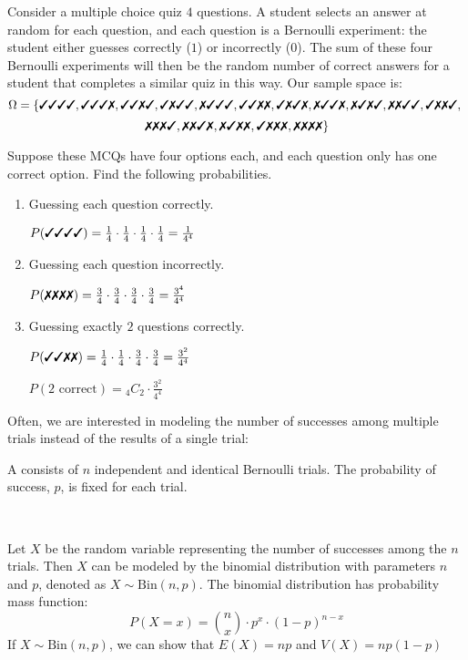 \begin{example}
    Consider a multiple choice quiz $4$ questions. A student selects an answer at random for each question, and each question is a Bernoulli experiment: the student either guesses correctly ($1$) or incorrectly ($0$). The sum of these four Bernoulli experiments will then be the random number of correct answers for a student that completes a similar quiz in this way. Our sample space is: 
    $$\Omega = \left\{ \cmark \cmark \cmark \cmark, \cmark \cmark \cmark \xmark, \cmark \cmark \xmark \cmark, \cmark \xmark \cmark \cmark, \xmark \cmark \cmark \cmark, \cmark \cmark \xmark \xmark, \cmark \xmark \cmark \xmark, \xmark \cmark \cmark \xmark, \xmark \cmark \xmark \cmark, \xmark \xmark \cmark \cmark, \cmark \xmark \xmark \cmark, \right.$$
    $$\left. \xmark \xmark \xmark \cmark, \xmark \xmark \cmark \xmark, \xmark \cmark \xmark \xmark, \cmark \xmark \xmark \xmark, \xmark \xmark \xmark \xmark \right\}$$

    Suppose these MCQs have four options each, and each question only has one correct option. Find the following probabilities. 

    \begin{enumerate}[label=\alph*)]
        \item Guessing each question correctly. 

        $P(\cmark \cmark \cmark \cmark) = \frac{1}{4} \cdot \frac{1}{4} \cdot \frac{1}{4} \cdot \frac{1}{4} = \frac{1}{4^4}$

        \item Guessing each question incorrectly. 

        $P(\xmark \xmark \xmark \xmark) = \frac{3}{4} \cdot \frac{3}{4} \cdot \frac{3}{4} \cdot \frac{3}{4} = \frac{3^4}{4^4}$
        \item Guessing exactly $2$ questions correctly. 

        $P(\cmark \cmark \xmark \xmark) = \frac{1}{4} \cdot \frac{1}{4} \cdot \frac{3}{4} \cdot \frac{3}{4} = \frac{3^2}{4^4}$

        $P(2 \text{ correct}) = {}_4C_2 \cdot \frac{3^2}{4^4}$
    \end{enumerate}
\end{example}

Often, we are interested in modeling the number of successes among multiple trials instead of the results of a single trial:

\begin{definition}
    A  consists of $n$ independent and identical Bernoulli trials. The probability of success, $p$, is fixed for each trial. 

    {~~~}

    Let $X$ be the random variable representing the number of successes among the $n$ trials. Then $X$ can be modeled by the binomial distribution with parameters $n$ and $p$, denoted as $X \sim \mathrm{Bin}(n, p)$. The binomial distribution has probability mass function: $$P(X = x) = \binom{n}{x} \cdot p^x \cdot (1 - p)^{n - x}$$ If $X \sim \mathrm{Bin}(n, p)$, we can show that $E(X) = np$ and $V(X) = np(1 - p)$
\end{definition}

